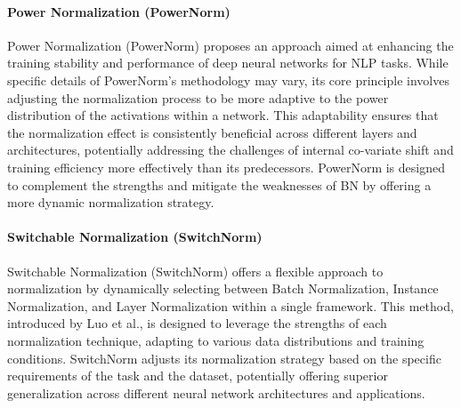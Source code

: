 \paragraph{Power Normalization (PowerNorm)}
Power Normalization (PowerNorm) proposes an approach aimed at enhancing the training stability and performance of deep neural networks for NLP tasks. While specific details of PowerNorm's methodology may vary, its core principle involves adjusting the normalization process to be more adaptive to the power distribution of the activations within a network. This adaptability ensures that the normalization effect is consistently beneficial across different layers and architectures, potentially addressing the challenges of internal co-variate shift and training efficiency more effectively than its predecessors.
PowerNorm is designed to complement the strengths and mitigate the weaknesses of BN by offering a more dynamic normalization strategy.

\paragraph{Switchable Normalization (SwitchNorm)}
Switchable Normalization (SwitchNorm) offers a flexible approach to normalization by dynamically selecting between Batch Normalization, Instance Normalization, and Layer Normalization within a single framework. This method, introduced by Luo et al., is designed to leverage the strengths of each normalization technique, adapting to various data distributions and training conditions. SwitchNorm adjusts its normalization strategy based on the specific requirements of the task and the dataset, potentially offering superior generalization across different neural network architectures and applications.


